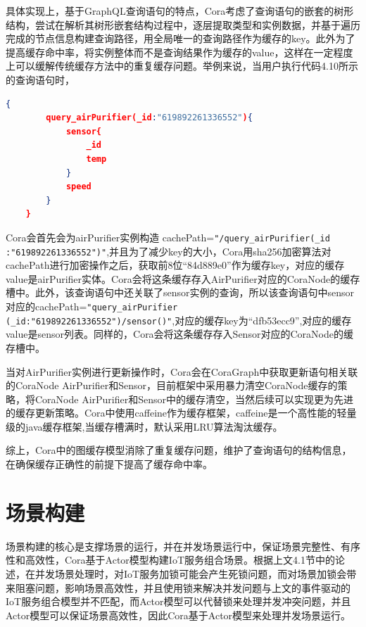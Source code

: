 \documentclass[winfonts,master,twoside]{njuthesis}
\begin{document}
具体实现上，基于GraphQL查询语句的特点，Cora考虑了查询语句的嵌套的树形结构，尝试在解析其树形嵌套结构过程中，逐层提取类型和实例数据，并基于遍历完成的节点信息构建查询路径，用全局唯一的查询路径作为缓存的key。此外为了提高缓存命中率，将实例整体而不是查询结果作为缓存的value，这样在一定程度上可以缓解传统缓存方法中的重复缓存问题。举例来说，当用户执行代码4.10所示的查询语句时，
  \begin{lstlisting}[caption={查询语句示例},language=json,basicstyle=\footnotesize] 
    {
        query_airPurifier(_id:"619892261336552"){
            sensor{
                _id
                temp
            }
            speed
        }
    }
   \end{lstlisting}
 Cora会首先会为airPurifier实例构造
 cachePath=\texttt{"/query\_airPurifier(\_id\\:"619892261336552")"},并且为了减少key的大小，Cora用sha256加密算法对cachePath进行加密操作之后，获取前8位“84d889e0”作为缓存key，对应的缓存value是airPurifier实体。Cora会将这条缓存存入AirPurifier对应的CoraNode的缓存槽中。此外，该查询语句中还关联了sensor实例的查询，所以该查询语句中sensor对应的cachePath=\texttt{"query\_airPurifier\\(\_id:"619892261336552")/sensor()"},对应的缓存key为“dfb53ecc9”,对应的缓存value是sensor列表。同样的，Cora会将这条缓存存入Sensor对应的CoraNode的缓存槽中。
 
 当对AirPurifier实例进行更新操作时，Cora会在CoraGraph中获取更新语句相关联的CoraNode    AirPurifier和Sensor，目前框架中采用暴力清空CoraNode缓存的策略，将CoraNode AirPurifier和Sensor中的缓存清空，当然后续可以实现更为先进的缓存更新策略。Cora中使用caffeine作为缓存框架，caffeine\cite{caffeine}是一个高性能的轻量级的java缓存框架,当缓存槽满时，默认采用LRU算法淘汰缓存。
 
综上，Cora中的图缓存模型消除了重复缓存问题，维护了查询语句的结构信息，在确保缓存正确性的前提下提高了缓存命中率。
 
\section{场景构建}
场景构建的核心是支撑场景的运行，并在并发场景运行中，保证场景完整性、有序性和高效性，Cora基于Actor模型构建IoT服务组合场景。根据上文4.1节中的论述，在并发场景处理时，对IoT服务加锁可能会产生死锁问题，而对场景加锁会带来阻塞问题，影响场景高效性，并且使用锁来解决并发问题与上文的事件驱动的IoT服务组合模型并不匹配，而Actor模型可以代替锁来处理并发冲突问题，并且Actor模型可以保证场景高效性，因此Cora基于Actor模型来处理并发场景运行。
\end{document}
